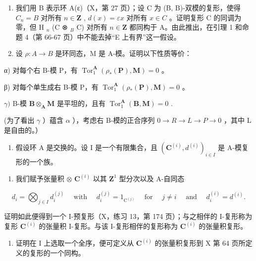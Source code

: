 
\begin{enumerate}
\def\labelenumi{\arabic{enumi})}
\item
  我们用 B 表示环 A(ε)（X，第 27 页）；设 C 为 (B, B)-双模的复形，使得 \(C_{n} = B\) 对所有 \(n \in \mathbf{Z}\) , \(d(x) = \varepsilon x\) 对所有 \(x \in C\) 。证明复形 C 的同调为零，但 H \(_{n}\) (C ⊗ \(_{B}\) C) 对所有 \(n \in \mathbf{Z}\) 都同构于 A。由此推出，在引理 1 和命题 4（第 66-67 页）中不能去掉“E 上有界”这一假设。
\item
  设 \(\rho: A \to B\) 是环同态，M 是 A-模。证明以下性质等价：
\end{enumerate}

α) 对每个右 B-模 P，有 \(\operatorname{Tor}_1^{\mathbf{A}}(\rho_*(\mathbf{P}), \mathbf{M}) = 0\) 。

β) 对每个单生成右 B-模 P，有 \(\operatorname{Tor}_1^{\mathbf{A}}(\rho_{*}(\mathbf{P}),\mathbf{M}) = 0\) 。

\(\gamma)\) B-模 \(\mathbf{B} \otimes_{\mathbf{A}} \mathbf{M}\) 是平坦的，且有 \(\operatorname{Tor}_{1}^{\mathbf{A}}(\mathbf{B}, \mathbf{M}) = 0\) .

(为了看出 \(\gamma\) ）蕴含 \(\alpha\) ），考虑右 B-模的正合序列 \(0 \to R \to L \to P \to 0\) ，其中 L 是自由的。）

\begin{enumerate}
\def\labelenumi{\arabic{enumi})}
\setcounter{enumi}{2}
\tightlist
\item
  假设环 A 是交换的。设 I 是一个有限集合，且 \((\mathbf{C}^{(i)}, d^{(i)})_{i \in I}\) 是 A-模复形的一个族。
\end{enumerate}

\begin{enumerate}
\def\labelenumi{\alph{enumi})}
\tightlist
\item
  我们赋予张量积 \(\otimes\) \(\mathbf{C}^{(i)}\) 以其 \(\mathbf{Z}^1\) 型分次以及 A-自同态
\end{enumerate}

\[
d _ {i} = \bigotimes_ {j \in I} d _ {i} ^ {(j)} \quad \text { with } \quad d _ {i} ^ {(j)} = 1 _ {\mathrm{C} ^ {(j)}} \quad \text { for } \quad j \neq i \quad \text { and } \quad d _ {i} ^ {(i)} = d ^ {(i)}.
\]

证明如此便得到一个 I-预复形（X，练习 13，第 174 页）；与之相伴的 I-复形称为复形 \(\mathbf{C}^{(i)}\) 的张量积 I-复形。与该 I-复形相伴的复形称为 \(\mathbf{C}^{(i)}\) 的张量积复形。

\begin{enumerate}
\def\labelenumi{\alph{enumi})}
\setcounter{enumi}{1}
\tightlist
\item
  证明在 I 上选取一个全序，便可定义从 \(\mathbf{C}^{(i)}\) 的张量积复形到 X 第 64 页所定义的复形的一个同构。
\end{enumerate}

